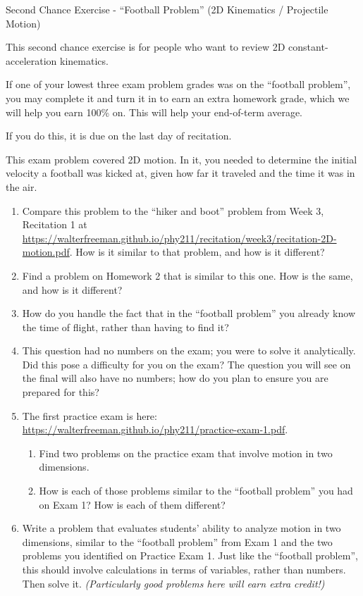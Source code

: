 \documentclass[12pt]{article}
\begin{document}
\begin{center}
\Large
\sc Second Chance Exercise - ``Football Problem'' (2D Kinematics / Projectile Motion)\rm





\normalsize
This second chance exercise is for people who want to review 2D constant-acceleration kinematics. 

If one of your lowest three exam problem grades was on the ``football problem'', you may complete it and turn it in to earn an extra homework grade, which we will help you earn 100\% on. This will help your end-of-term average.

If you do this, it is due on the last day of recitation.

\end{center}

\vspace{1.5in}

This exam problem covered 2D motion. In it, you needed to determine the initial velocity a football was kicked at, given how far it traveled and the time it was in the air.

\begin{enumerate}
	\item Compare this problem to the ``hiker and boot'' problem from Week 3, Recitation 1 at \url{https://walterfreeman.github.io/phy211/recitation/week3/recitation-2D-motion.pdf}. How is it similar to that problem, and how is it different?
	
	\item Find a problem on Homework 2 that is similar to this one. How is the same, and how is it different?
	
	\item How do you handle the fact that in the ``football problem'' you already know the time of flight, rather than having to find it?
	
	\item This question had no numbers on the exam; you were to solve it analytically. Did this pose a difficulty for you on the exam? The question you will see on the final will also have no numbers; how do you plan to ensure you are prepared for this?
	
	\item The first practice exam is here: \url{https://walterfreeman.github.io/phy211/practice-exam-1.pdf}. 
	\begin{enumerate}
		\item Find two problems on the practice exam that involve motion in two dimensions.
		\item How is each of those problems similar to the ``football problem'' you had on Exam 1? How is each of them different?
	\end{enumerate}
    \item Write a problem that evaluates students' ability to analyze motion in two dimensions, similar to the ``football problem'' from Exam 1 and the two problems you identified on Practice Exam 1. Just like the ``football problem'', this should involve calculations in terms of variables, rather than numbers. Then solve it. {\it (Particularly good problems here will earn extra credit!)}
\end{enumerate}
\end{document}
